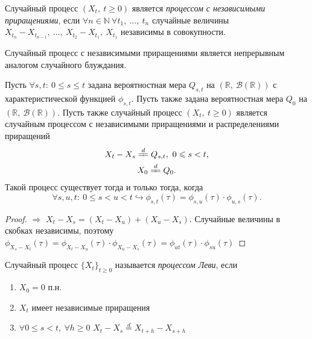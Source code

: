\begin{definition}
    Случайный процесс $\displaystyle ( X_{t} ,\ t\geqslant 0)$ является \textit{процессом с независимыми приращениями}, если $\displaystyle \forall n\in \mathbb{N} \ \forall t_{1} ,\ \dotsc ,\ t_{n}$ случайные величины $\displaystyle X_{t_{n}} -X_{t_{n-1}} ,\ \dotsc ,\ X_{t_{2}} -X_{t_{1}} ,\ X_{t_{1}}$ независимы в совокупности.
\end{definition}
\begin{note}
    Случайный процесс с независимыми приращениями является непрерывным аналогом случайного блуждания.
\end{note}
\begin{theorem}\label{4.3} Пусть $\displaystyle \forall s,t:\ 0\leqslant s\leqslant t$ задана вероятностная мера $\displaystyle Q_{s,t}$ на $\displaystyle (\mathbb{R} ,\ \mathcal{B}(\mathbb{R}))$ с характеристической функцией $\displaystyle \phi _{s,t}$. Пусть также задана вероятностная мера $\displaystyle Q_{0}$ на $\displaystyle (\mathbb{R} ,\ \mathcal{B}(\mathbb{R}))$. Пусть также случайный процесс $\displaystyle ( X_{t} ,\ t\geqslant 0)$ является случайным процессом с независимыми приращениями и распределениями приращений
\begin{gather*}
X_{t} -X_{s}\xlongequal{d} Q_{s,t} ,\ 0\leqslant s< t,\\
X_{0}\xlongequal{d} Q_{0} .
\end{gather*}
Такой процесс существует тогда и только тогда, когда
\begin{equation}
\forall s,u,t:\ 0\leqslant s< u< t\hookrightarrow \phi _{s,t}( \tau ) =\phi _{s,u}( \tau ) \cdotp \phi _{u,s}( \tau ) .
\end{equation}
\end{theorem}
\begin{proof}
$\Longrightarrow$ $X_t - X_s = (X_t - X_u) + (X_u - X_s)$. Случайные величины в скобках независимы, поэтому $\phi_{X_s - X_t}(\tau) =\phi_{X_t - X_u}(\tau)\cdot\phi_{X_u - X_s}(\tau) = \phi_{ut}(\tau)\cdot\phi_{su}(\tau)$
\end{proof}
\begin{definition}
     Случайный процесс $\{X_t\}_{t \geq 0}$ называется \textit{процессом Леви}, если
\begin{enumerate}
    \item $X_0 = 0$ п.н.
    \item $X_t$ имеет независимые приращения
    \item $\forall 0 \leq s < t, \ \forall h \geq 0$ $X_t - X_s \overset{d}{=} X_{t+h} - X_{s+h}$
\end{enumerate}
\end{definition}